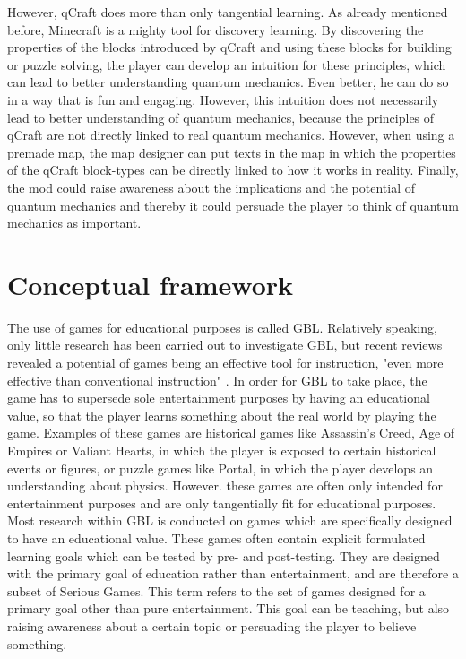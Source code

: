 \documentclass[12pt]{report} %
\begin{document}
However, qCraft does more than only tangential learning. As already mentioned before, Minecraft is a mighty tool for discovery learning. By discovering the properties of the blocks introduced by qCraft and using these blocks for building or puzzle solving, the player can develop an intuition for these principles, which can lead to better understanding quantum mechanics. Even better, he can do so in a way that is fun and engaging. However, this intuition does not necessarily lead to better understanding of quantum mechanics, because the principles of qCraft are not directly linked to real quantum mechanics. However, when using a premade map, the map designer can put texts in the map in which the properties of the qCraft block-types can be directly linked to how it works in reality. Finally, the mod could raise awareness about the implications and the potential of quantum mechanics and thereby it could persuade the player to think of quantum mechanics as important.

\section{Conceptual framework}

The use of games for educational purposes is called GBL. Relatively speaking, only little research has been carried out to investigate GBL, but recent reviews revealed a potential of games being an effective tool for instruction, "even more effective than conventional instruction" \cite[p.~1]{wouters}. In order for GBL to take place, the game has to supersede sole entertainment purposes by having an educational value, so that the player learns something about the real world by playing the game. Examples of these games are historical games like Assassin's Creed, Age of Empires or Valiant Hearts, in which the player is exposed to certain historical events or figures, or puzzle games like Portal, in which the player develops an understanding about physics. However. these games are often only intended for entertainment purposes and are only tangentially fit for educational purposes. Most research within GBL is conducted on games which are specifically designed to have an educational value. These games often contain explicit formulated learning goals which can be tested by pre- and post-testing. They are designed with the primary goal of education rather than entertainment, and are therefore a subset of Serious Games. This term refers to the set of games designed for a primary goal other than pure entertainment. This goal can be teaching, but also raising awareness about a certain topic or persuading the player to believe something.
\end{document}

